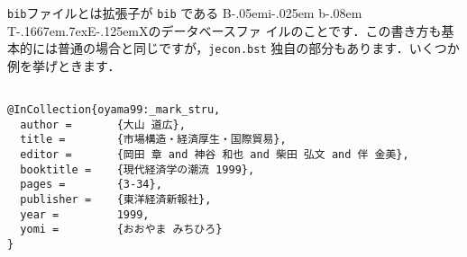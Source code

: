 \documentclass[a4j,10pt]{jarticle}
\def\BibTeX{{\rm B\kern-.05em{\sc i\kern-.025em b}\kern-.08em
    T\kern-.1667em\lower.7ex\hbox{E}\kern-.125emX}}
\begin{document}
\texttt{bib}ファイルとは拡張子が \texttt{bib} である \BibTeX のデータベースファ
イルのことです．この書き方も基本的には普通の場合と同じですが，\texttt{jecon.bst}
独自の部分もあります．いくつか例を挙げときます．

\begin{screen}
 \begin{verbatim}

@InCollection{oyama99:_mark_stru,
  author =       {大山 道広},
  title =        {市場構造・経済厚生・国際貿易},
  editor =       {岡田 章 and 神谷 和也 and 柴田 弘文 and 伴 金美},
  booktitle =    {現代経済学の潮流 1999},
  pages =        {3-34},
  publisher =    {東洋経済新報社},
  year =         1999,
  yomi =         {おおやま みちひろ}
}
 \end{verbatim}
\end{screen}
\end{document}
